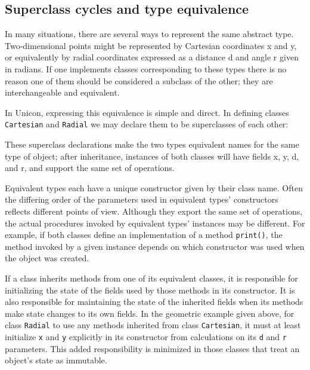 \subsection*{Superclass cycles and type equivalence}

In many situations, there are several ways to represent the same
abstract type. Two-dimensional points might be represented by
Cartesian coordinates x and y, or
equivalently by radial coordinates expressed as a distance d and angle
r given in radians. If one implements classes
corresponding to these types there is no reason one of them should be
considered a subclass of the other; they are interchangeable and
equivalent.

In Unicon, expressing this equivalence is simple and direct. In defining
classes \texttt{Cartesian} and \texttt{Radial} we may declare them to
be superclasses of each other:


These superclass declarations make the two types equivalent names for
the same type of object; after inheritance,
instances of both classes will
have fields x, y, d, and r, and support the same set of operations.

Equivalent types each have a unique constructor
given by their class name. Often the differing order of the parameters
used in equivalent types' constructors reflects
different points of view. Although they export the same set of
operations, the actual procedures invoked by equivalent
types' instances may be different. For example, if
both classes define an implementation of a method \texttt{print()}, the
method invoked by a given instance depends on which constructor was
used when the object was created.

If a class inherits methods from one of its equivalent classes, it
is responsible for initializing the state of the fields used by
those methods in its constructor. It is also responsible for
maintaining the state of the inherited fields when its methods make
state changes to its own fields. In the geometric example given above,
for class \texttt{Radial} to use any methods inherited from class
\texttt{Cartesian}, it must at least initialize \texttt{x} and
\texttt{y} explicitly in its constructor from calculations on its
\texttt{d} and \texttt{r} parameters. This added
responsibility is minimized in those classes that treat an
object's state as immutable.

